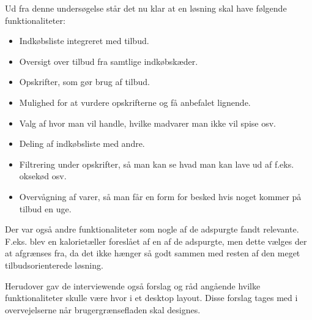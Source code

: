 Ud fra denne undersøgelse står det nu klar at en løsning skal have følgende funktionaliteter:

\begin{itemize}
	\item Indkøbsliste integreret med tilbud.
	\item Oversigt over tilbud fra samtlige indkøbskæder.
	\item Opskrifter, som gør brug af tilbud.
	\item Mulighed for at vurdere opskrifterne og få anbefalet lignende.
	\item Valg af hvor man vil handle, hvilke madvarer man ikke vil spise osv.
	\item Deling af indkøbsliste med andre.
	\item Filtrering under opskrifter, så man kan se hvad man kan lave ud af f.eks. oksekød osv.
	\item Overvågning af varer, så man får en form for besked hvis noget kommer på tilbud en uge.
\end{itemize}

Der var også andre funktionaliteter som nogle af de adspurgte fandt relevante.
F.eks. blev en kalorietæller foreslået af en af de adspurgte, men dette vælges der at afgrænses fra, da det ikke hænger så godt sammen med resten af den meget tilbudsorienterede løsning.

Herudover gav de interviewende også forslag og råd angående hvilke funktionaliteter skulle være hvor i et desktop layout. 
Disse forslag tages med i overvejelserne når brugergrænsefladen skal designes.
